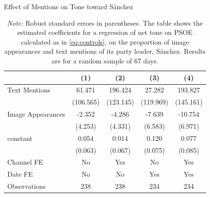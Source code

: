 \documentclass[12pt]{article}
\begin{document}
	
	\begin{table}[!htb]\centering
		\def\sym#1{\ifmmode^{#1}\else\(^{#1}\)\fi}
		\caption{Effect of Mentions on Tone toward Sánchez}
		\begin{tabular}{l*{4}{c}}
			\hline\hline
			&\multicolumn{1}{c}{(1)}         &\multicolumn{1}{c}{(2)}         &\multicolumn{1}{c}{(3)}         &\multicolumn{1}{c}{(4)}         \\
			\hline
			Text Mentions   &   61.471         &  196.424         &   27.282         &  193.827         \\
			&(106.565)         &(123.145)         &(119.969)         &(145.161)         \\
			Image Appearances  &   -2.352         &   -4.286         &   -7.639         &  -10.754         \\
			&  (4.253)         &  (4.331)         &  (6.583)         &  (6.971)         \\
			constant          &    0.054         &    0.014         &    0.120         &    0.077         \\
			&  (0.063)         &  (0.067)         &  (0.075)         &  (0.085)         \\
			Channel FE      &       No         &      Yes         &       No         &      Yes         \\
			Date FE         &       No         &       No         &      Yes         &      Yes         \\
			\hline
			Observations    &      238         &      238         &      234         &      234         \\
			\hline\hline
		\end{tabular}
		\label{tab:sanchez_images}
		\vspace{0.5em}
		\caption*{\scriptsize\emph{Note:} Robust standard errors in parentheses. The table shows the estimated coefficients for a regression of net tone on PSOE calculated as in \ref{eq:controls}, on the proportion of image appearances and text mentions of its party leader, Sánchez. Results are for a random sample of 67 days. }
	\end{table}
	
\end{document}
